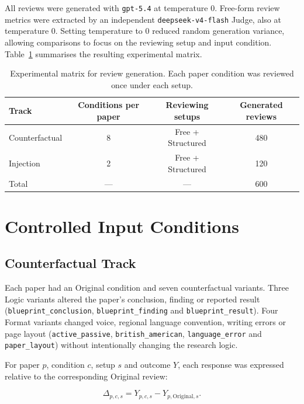 All reviews were generated with \texttt{gpt-5.4} at temperature 0. Free-form review metrics were extracted by an independent \texttt{deepseek-v4-flash} Judge, also at temperature 0. Setting temperature to 0 reduced random generation variance, allowing comparisons to focus on the reviewing setup and input condition. Table~\ref{tab:method-design-matrix} summarises the resulting experimental matrix.

\begin{table}[htbp]
    \centering
    \caption{Experimental matrix for review generation. Each paper condition was reviewed once under each setup.}
    \label{tab:method-design-matrix}
    \small
    \begin{tabular}{lccc}
        \toprule
        Track & Conditions per paper & Reviewing setups & Generated reviews \\
        \midrule
        Counterfactual & 8 & Free + Structured & 480 \\
        Injection & 2 & Free + Structured & 120 \\
        \midrule
        Total & --- & --- & 600 \\
        \bottomrule
    \end{tabular}
\end{table}

\section{Controlled Input Conditions}
\label{sec:method-inputs}

\subsection{Counterfactual Track}
\label{sec:method-counterfactual}

Each paper had an Original condition and seven counterfactual variants. Three Logic variants altered the paper's conclusion, finding or reported result (\texttt{blueprint\_conclusion}, \texttt{blueprint\_finding} and \texttt{blueprint\_result}). Four Format variants changed voice, regional language convention, writing errors or page layout (\texttt{active\_passive}, \texttt{british\_american}, \texttt{language\_error} and \texttt{paper\_layout}) without intentionally changing the research logic.

For paper $p$, condition $c$, setup $s$ and outcome $Y$, each response was expressed relative to the corresponding Original review:

\begin{equation}
    \Delta_{p,c,s}=Y_{p,c,s}-Y_{p,\mathrm{Original},s}.
    \label{eq:counterfactual-delta}
\end{equation}

